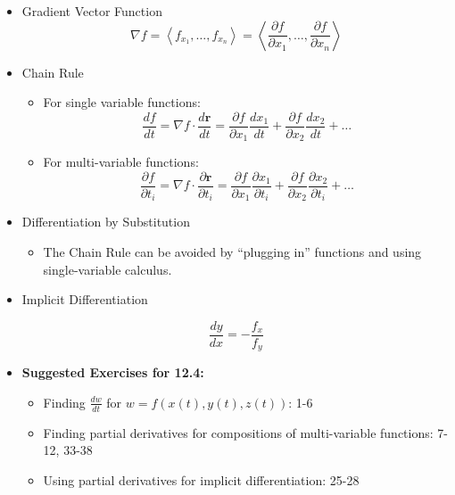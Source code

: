 \documentclass[12pt]{article}
\newcommand{\ds}{\displaystyle}
\renewcommand{\vec}[1]{\mathbf{#1}}
\newcommand{\<}{\left<}
\renewcommand{\>}{\right>}
\begin{document}
  \begin{itemize}
  
    \item Gradient Vector Function
      \[\nabla f = \< f_{x_1}, \dots, f_{x_n} \> = \<\frac{\partial f}{\partial x_1}, \dots, \frac{\partial f}{\partial x_n}\>\]
    
    \item Chain Rule
      \begin{itemize}
        \item For single variable functions:
          \[\frac{df}{dt}=\nabla{f}\cdot\frac{d\vec{r}}{dt}=\frac{\partial f}{\partial x_1}\frac{dx_1}{dt}+\frac{\partial f}{\partial x_2}\frac{dx_2}{dt}+\dots\]
        \item For multi-variable functions:
          \[\frac{\partial f}{\partial t_i}=\nabla{f}\cdot\frac{\partial\vec{r}}{\partial t_i}=\frac{\partial f}{\partial x_1}\frac{\partial x_1}{\partial t_i}+\frac{\partial f}{\partial x_2}\frac{\partial x_2}{\partial t_i}+\dots\]
      \end{itemize}
      
    \item Differentiation by Substitution
    
      \begin{itemize}
      \item The Chain Rule can be avoided by ``plugging in'' functions and using single-variable calculus.
      \end{itemize}
      
    \item Implicit Differentiation

      \[\ds\frac{dy}{dx} = -\frac{f_x}{f_y}\]
      
    \item \textbf{Suggested Exercises for 12.4:}
    
      \begin{itemize}
      \item Finding $\frac{dw}{dt}$ for $w=f(x(t),y(t),z(t))$: 1-6
      \item Finding partial derivatives for compositions of multi-variable functions: 7-12, 33-38
      \item Using partial derivatives for implicit differentiation: 25-28
      \end{itemize}
  
  \end{itemize}
  
  \newpage
  
\end{document}
